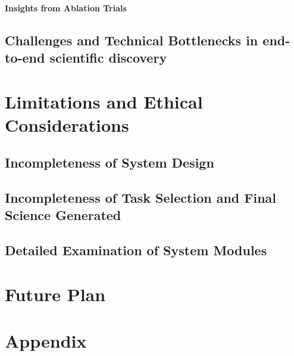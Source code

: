 \documentclass{article}
\begin{document}

\paragraph{Insights from Ablation Trials}


\subsection{Challenges and Technical Bottlenecks in end-to-end scientific discovery}


\section{Limitations and Ethical Considerations}


\subsection{Incompleteness of System Design}

\subsection{Incompleteness of Task Selection and Final Science Generated}

\subsection{Detailed Examination of System Modules}

\section{Future Plan}


\appendix
\section{Appendix}
\end{document}
